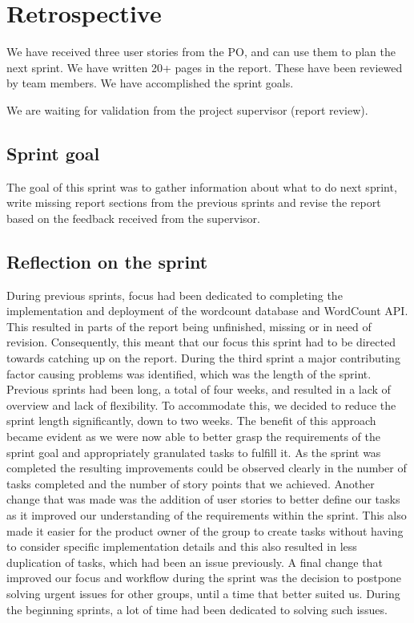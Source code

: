 \section{Retrospective}
We have received three user stories from the PO, and can use them to plan the next sprint.  We have written 20+ pages in the report. These have been reviewed by team members.  We have accomplished the sprint goals. 

We are waiting for validation from the project supervisor (report review).

\subsection{Sprint goal}
The goal of this sprint was to gather information about what to do next sprint, write missing report sections from the previous sprints and revise the report based on the feedback received from the supervisor. 

\subsection{Reflection on the sprint}
During previous sprints, focus had been dedicated to completing the implementation and deployment of the wordcount database and WordCount API. This resulted in parts of the report being unfinished, missing or in need of revision. Consequently, this meant that our focus this sprint had to be directed towards catching up on the report.
During the third sprint a major contributing factor causing problems was identified, which was the length of the sprint. Previous sprints had been long, a total of four weeks, and resulted in a lack of overview and lack of flexibility. To accommodate this, we decided to reduce the sprint length significantly, down to two weeks. The benefit of this approach became evident as we were now able to better grasp the requirements of the sprint goal and appropriately granulated tasks to fulfill it. As the sprint was completed the resulting improvements could be observed clearly in the number of tasks completed and the number of story points that we achieved. 
Another change that was made was the addition of user stories to better define our tasks as it improved our understanding of the requirements within the sprint. This also made it easier for the product owner of the group to create tasks without having to consider specific implementation details and this also resulted in less duplication of tasks, which had been an issue previously.
A final change that improved our focus and workflow during the sprint was the decision to postpone solving urgent issues for other groups, until a time that better suited us. During the beginning sprints, a lot of time had been dedicated to solving such issues.


